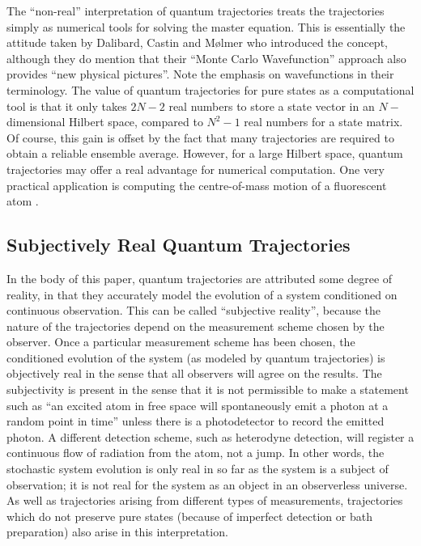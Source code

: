 The ``non-real'' interpretation of quantum trajectories treats the 
trajectories simply as numerical tools for solving the master equation.
This is essentially the attitude taken by Dalibard, Castin and M\o lmer 
\cite{DalCasMol92} who introduced the concept, although they do mention that their 
``Monte Carlo Wavefunction''  approach also provides ``new physical 
pictures''. Note the emphasis on wavefunctions in their terminology.
The value of quantum trajectories for pure states as a computational tool 
is that it only takes $2N-2$ real numbers to store a state vector in an 
$N-$dimensional Hilbert space, compared to $N^2-1$ real numbers for a state 
matrix. Of course, this gain is offset by the fact that many trajectories 
are required to obtain a reliable ensemble average. However, for a large 
Hilbert space, quantum trajectories may offer a real advantage for 
numerical computation. One very practical application is computing 
the centre-of-mass motion of a fluorescent atom
\cite{MolCasDal93,DumZolRit92,MarDumTaiZol93,Mar93,HolMarMarZol95}. 

\subsection{Subjectively Real Quantum Trajectories}

In the body of this paper, quantum trajectories are attributed some degree of 
reality, in that they accurately model the evolution of a system conditioned on 
continuous observation. This can be called ``subjective reality'', 
because the nature of the trajectories depend on the measurement scheme 
chosen by the observer. Once a particular measurement scheme has been
chosen, the conditioned evolution of the system (as modeled by quantum trajectories)
is objectively real in the sense that all observers will agree on the results. The
subjectivity is present in the sense that it is not permissible to make a
statement such as ``an excited atom in free space will spontaneously emit a photon
at a random point in time'' unless there is a photodetector to record the emitted
photon. A different detection scheme, such as heterodyne detection, will register
a continuous flow of radiation from the atom, not a jump. In other words, the
stochastic system evolution is only real in so far as the system is a subject of
observation; it is not real for the system as an object in an observerless universe.
As well as trajectories arising from different types of measurements, trajectories
which do not preserve pure  states (because of imperfect detection or bath
preparation) also arise in this interpretation.  

